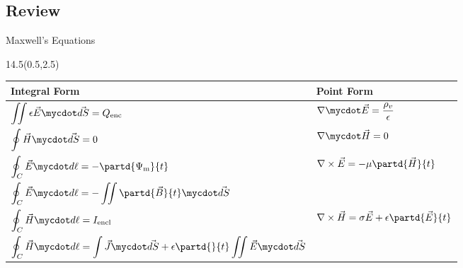 \begin{lesson33}
\section{Review}
\begin{frame}{Maxwell's Equations}
\begin{textblock}{14.5}(0.5,2.5)

\begin{center}
\begin{tabular}{| l | l |}
\hline
\textbf{Integral Form} & \textbf{Point Form}  \\\hline
 ${\displaystyle \iint \epsilon\vec{E}\mycdot \vec{dS}} = Q_{\text{enc}} $ 
 & $\nabla\mycdot\vec{E}  = \dfrac{\rho_v}{\epsilon}$   \\ \hline
${\displaystyle\oint \vec{H}\mycdot\vec{dS} } = 0 $ 
& $\nabla\mycdot\vec{H} = 0$ \\ \hline
$\begin{aligned}
\displaystyle\oint_C \vec{E}\mycdot d\ell &=-\partd{\Psi_{\text{m}}}{t} \\
\displaystyle\oint_C \vec{E}\mycdot d\ell &=  -\iint\partd{\vec{B}}{t}\mycdot \vec{dS}
\end{aligned}$
&$\begin{aligned}
\nabla\times\vec{E} &= -\mu\partd{\vec{H}}{t} \\
\end{aligned}$
\\ \hline
$\begin{aligned}
\displaystyle\oint_C\vec{H}\mycdot d\ell &= I_{\text{encl}} \\ 
\displaystyle\oint_C\vec{H}\mycdot d\ell &= \int \vec{J}\mycdot\vec{dS} 
 + \epsilon\partd{}{t}\iint\vec{E}\mycdot \vec{dS}
\end{aligned} $
& $\begin{aligned}
\nabla\times\vec{H} &= \sigma \vec{E} + \epsilon\partd{\vec{E}}{t} \\ 
 \end{aligned}$ \\ \hline
\end{tabular}
\end{center}

\end{textblock}
\end{frame}


\end{lesson33}
